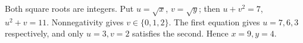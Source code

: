 Both square roots are integers. Put $u=\sqrt x$, $v=\sqrt y$; then $u+v^2=7$, $u^2+v=11$. Nonnegativity gives $v\in\{0,1,2\}$. The first equation gives $u=7,6,3$ respectively, and only $u=3,v=2$ satisfies the second. Hence $\boxed{x=9,y=4}$.
